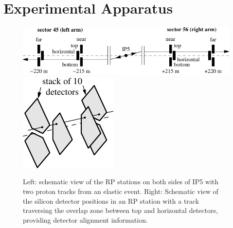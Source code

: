 \section{Experimental Apparatus}
\label{sec:exp apparatus}

\begin{figure}
\begin{center}
\includegraphics{fig/elastic_principle.pdf}
\hfil
\includegraphics{fig/stationScheme.pdf}
\caption{%
Left: schematic view of the RP stations on both sides of IP5 with two proton tracks from an elastic event. Right: Schematic view of the silicon detector positions in an RP station with a track traversing the overlap zone between top and horizontal detectors, providing detector alignment information. 
}
\label{fig:rpsketch}
\end{center}
\end{figure}

